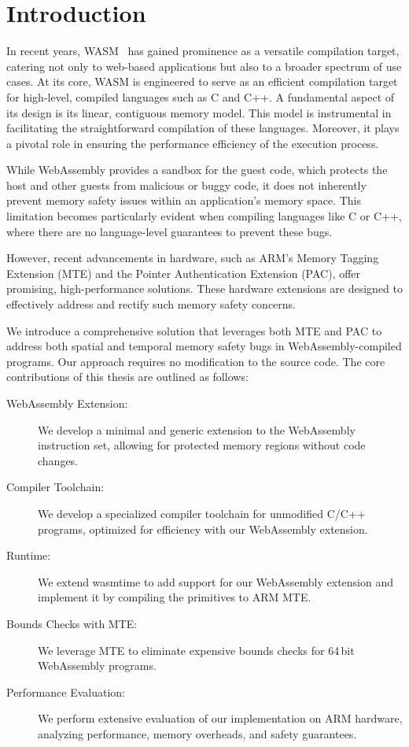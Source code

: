 \chapter{Introduction}
\label{ch:intro}

In recent years, \ac{WASM}~\cite{haas2017bringing} has gained prominence as a versatile compilation target, catering not only to web-based applications but also to a broader spectrum of use cases.
At its core, \ac{WASM} is engineered to serve as an efficient compilation target for high-level, compiled languages such as C and C++.
A fundamental aspect of its design is its linear, contiguous memory model.
This model is instrumental in facilitating the straightforward compilation of these languages.
Moreover, it plays a pivotal role in ensuring the performance efficiency of the execution process.

While WebAssembly provides a sandbox for the guest code, which protects the host and other guests from malicious or buggy code, it does not inherently prevent memory safety issues within an application's memory space.
This limitation becomes particularly evident when compiling languages like C or C++, where there are no language-level guarantees to prevent these bugs.

However, recent advancements in hardware, such as ARM's Memory Tagging Extension (MTE) and the Pointer Authentication Extension (PAC), offer promising, high-performance solutions. These hardware extensions are designed to effectively address and rectify such memory safety concerns.

We introduce a comprehensive solution that leverages both MTE and PAC to address both spatial and temporal memory safety bugs in WebAssembly-compiled programs.
Our approach requires no modification to the source code.
The core contributions of this thesis are outlined as follows:

\begin{description}
    \item[WebAssembly Extension:] We develop a minimal and generic extension to the WebAssembly instruction set, allowing for protected memory regions without code changes.
    \item[Compiler Toolchain:] We develop a specialized compiler toolchain for unmodified C/C++ programs, optimized for efficiency with our WebAssembly extension.
    \item[Runtime:] We extend wasmtime to add support for our WebAssembly extension and implement it by compiling the primitives to ARM MTE.
    \item[Bounds Checks with MTE:] We leverage MTE to eliminate expensive bounds checks for 64\,bit WebAssembly programs.
    \item[Performance Evaluation:] We perform extensive evaluation of our implementation on ARM hardware, analyzing performance, memory overheads, and safety guarantees.
\end{description}
